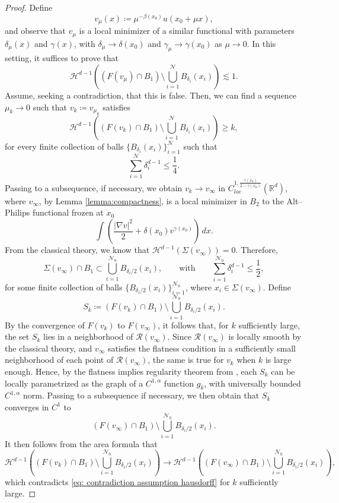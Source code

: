 \documentclass[reqno,11pt]{amsart}
\newcommand{\1}{\mathds{1}}  %
\numberwithin{equation}{section}
\begin{document}
\begin{proof}
Define
\[
    v_\mu(x) \coloneqq \mu^{-\beta(x_0)}u(x_0+\mu x),
\]
and observe that \(v_\mu\) is a local minimizer of a similar functional with parameters $\delta_\mu(x)$ and $\gamma(x)$, with \(\delta_\mu \to \delta(x_0)\) and \(\gamma_\mu \to \gamma(x_0)\) as \(\mu \to 0\). In this setting, it suffices to prove that
\[
    \mathcal{H}^{d-1}\left(\left(F(v_\mu)\cap B_1\right)\setminus \bigcup_{i=1}^{\mathcal N} B_{\delta_i}(x_i)\right) \lesssim 1.
\]
Assume, seeking a contradiction, that this is false. Then, we can find a sequence \(\mu_k \to 0\) such that \(v_k \coloneqq v_{\mu_k}\) satisfies
\begin{equation}\label{eq: contradiction assumption hausdorff}
    \mathcal{H}^{d-1}\left(\left(F(v_k)\cap B_1\right)\setminus \bigcup_{i=1}^{\mathcal N} B_{\delta_i}(x_i)\right) \geq k,
\end{equation}
for every finite collection of balls \(\{B_{\delta_i}(x_i)\}_{i=1}^{\mathcal N}\) such that
\[
    \sum_{i=1}^{\mathcal N} \delta_i^{d-1} \leq \frac{1}{4}.
\]
Passing to a subsequence, if necessary, we obtain \(v_k \to v_\infty\) in $C^{1,\frac{\gamma(x_0)}{2-\gamma(x_0)}}_{loc}(\mathbb{R}^d)$, where \(v_\infty\), by Lemma \ref{lemma:compactness}, is a local minimizer in \(B_2\) to the Alt--Philips functional frozen at $x_0$
\[
    \int \left(\frac{|\nabla v|^2}{2}+\delta(x_0)v^{\gamma(x_0)}\right)\,dx.
\]
From the classical theory, we know that \(\mathcal{H}^{d-1}(\Sigma(v_\infty)) = 0\). Therefore,
\[
    \Sigma(v_\infty) \cap B_1 \subset \bigcup_{i=1}^{\mathcal{N}_0} B_{\delta_i/2}(x_i), \qquad \text{with} \qquad \sum_{i=1}^{\mathcal{N}_0} \delta_i^{d-1} \leq \frac{1}{2},
\]
for some finite collection of balls \(\{B_{\delta_i/2}(x_i)\}_{i=1}^{\mathcal{N}_0}\), where \(x_i \in \Sigma(v_\infty)\). Define
\[
    S_k \coloneqq \left(F(v_k) \cap B_1\right) \setminus \bigcup_{i=1}^{\mathcal{N}_0} B_{\delta_i/2}(x_i).
\]
By the convergence of \(F(v_k)\) to \(F(v_\infty)\), it follows that, for \(k\) sufficiently large, the set \(S_k\) lies in a neighborhood of \(\mathcal{R}(v_\infty)\). Since \(\mathcal{R}(v_\infty)\) is locally smooth by the classical theory, and \(v_\infty\) satisfies the flatness condition in a sufficiently small neighborhood of each point of \(\mathcal{R}(v_\infty)\), the same is true for \(v_k\) when \(k\) is large enough. Hence, by the flatness implies regularity theorem from \cite{ASTU1}, each \(S_k\) can be locally parametrized as the graph of a \(C^{1,\alpha}\) function \(g_k\), with universally bounded \(C^{1,\alpha}\) norm. Passing to a subsequence if necessary, we then obtain that \(S_k\) converges in \(C^1\) to
\[
    \left(F(v_\infty) \cap B_1\right) \setminus \bigcup_{i=1}^{\mathcal{N}_0} B_{\delta_i/2}(x_i).
\]
It then follows from the area formula that
\[
    \mathcal{H}^{d-1}\left(\left(F(v_k) \cap B_1\right) \setminus \bigcup_{i=1}^{\mathcal{N}_0} B_{\delta_i/2}(x_i)\right) \to \mathcal{H}^{d-1}\left(\left(F(v_\infty) \cap B_1\right) \setminus \bigcup_{i=1}^{\mathcal{N}_0} B_{\delta_i/2}(x_i)\right),
\]
which contradicts \eqref{eq: contradiction assumption hausdorff} for \(k\) sufficiently large.
\end{proof}
\end{document}
